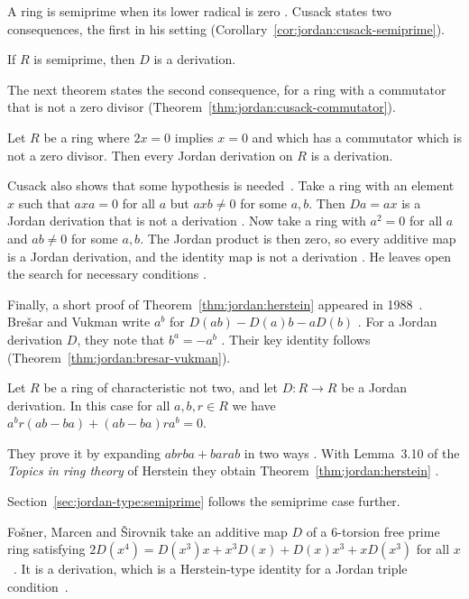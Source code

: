 A ring is semiprime when its lower radical is zero \cite[p.~322]{Cusack1975}.
Cusack states two consequences, the first in his setting
(Corollary~\ref{cor:jordan:cusack-semiprime}).

\begin{corollary}\label{cor:jordan:cusack-semiprime}
If $R$ is semiprime, then $D$ is a derivation.
\end{corollary}

The next theorem states the second consequence, for a ring with a commutator
that is not a zero divisor (Theorem~\ref{thm:jordan:cusack-commutator}).

\begin{theorem}\label{thm:jordan:cusack-commutator}
Let $R$ be a ring where $2x=0$ implies $x=0$ and which has a commutator which is not a
zero divisor. Then every Jordan derivation on $R$ is a derivation.
\end{theorem}

Cusack also shows that some hypothesis is needed~\cite[p.~324]{Cusack1975}. Take a ring with an element
$x$ such that $axa=0$ for all $a$ but $axb\neq0$ for some $a,b$. Then $Da=ax$
is a Jordan derivation that is not a derivation \cite[\S3,
p.~324]{Cusack1975}. Now take a ring with $a^{2}=0$ for all $a$ and $ab\neq0$
for some $a,b$. The Jordan product is then zero, so every additive map is a
Jordan derivation, and the identity map is not a derivation \cite[\S3,
p.~324]{Cusack1975}. He leaves open the search for necessary conditions
\cite[p.~324]{Cusack1975}.

Finally, a short proof of Theorem~\ref{thm:jordan:herstein} appeared in 1988~\cite[p.~321]{BresarVukman1988}.
Brešar and Vukman write $a^{b}$ for $D(ab)-D(a)b-aD(b)$
\cite[p.~321]{BresarVukman1988}. For a Jordan derivation $D$, they note that
$b^{a}=-a^{b}$ \cite[p.~321]{BresarVukman1988}. Their key identity follows
(Theorem~\ref{thm:jordan:bresar-vukman}).

\begin{theorem}\label{thm:jordan:bresar-vukman}
Let $R$ be a ring of characteristic not two, and let $D\colon R\to R$ be a Jordan
derivation. In this case for all $a,b,r\in R$ we have
$a^{b}r(ab-ba)+(ab-ba)ra^{b}=0$.
\end{theorem}

They prove it by expanding $abrba+barab$ in two ways
\cite[p.~322]{BresarVukman1988}. With Lemma~3.10 of the \emph{Topics in ring
theory} of Herstein they obtain Theorem~\ref{thm:jordan:herstein}
\cite[p.~322]{BresarVukman1988}.

Section~\ref{sec:jordan-type:semiprime} follows the semiprime case further.

Fo\v{s}ner, Marcen and \v{S}irovnik take an additive map $D$ of a
6-torsion free prime ring satisfying
$2D(x^4)=D(x^3)x+x^3D(x)+D(x)x^3+xD(x^3)$
for all $x$~\cite{WlOnCertainIdentityRelatedToHers2016}. It is a derivation, which is a Herstein-type identity for a
Jordan
triple condition~\cite{WlOnCertainIdentityRelatedToHers2016}.
